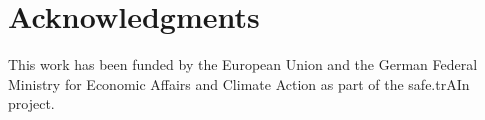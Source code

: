 \section{Acknowledgments}
This work has been funded by the European Union and the German Federal Ministry for Economic Affairs and Climate Action as part of the safe.trAIn project.